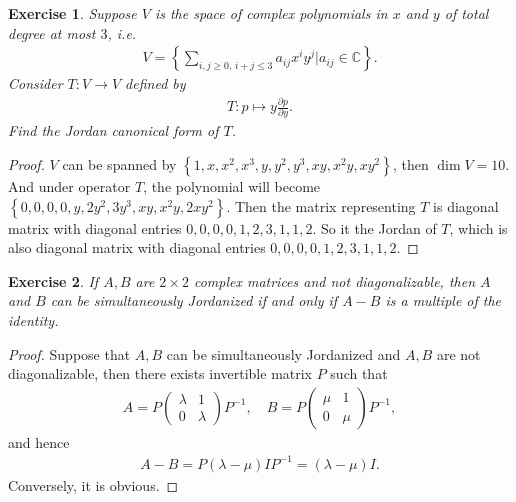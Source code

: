 \documentclass[11pt]{book}
\newtheorem{exercise}{Exercise}[section]
\theoremstyle{definition}
\numberwithin{equation}{chapter}
\begin{document}
\medskip

\begin{exercise}
Suppose $V$ is the space of complex polynomials in $x$ and $y$ of total degree at most $3$, i.e.
\begin{align*}
    V = \left\{\sum_{i,j \geq 0,\,i+j \leq 3} a_{ij} x^i y^j \Bigg| a_{ij} \in \mathbb{C} \right\}.
\end{align*}
Consider $T: V \to V$ defined by 
\begin{align*}
    T: p \mapsto y \frac{\partial p}{\partial y}.
\end{align*}
Find the Jordan canonical form of $T$.
\end{exercise}
\begin{proof}
$V$ can be spanned by $\left\{1, x, x^2, x^3, y, y^2, y^3, xy, x^2y, xy^2\right\}$, then $\dim  V = 10$. And under operator $T$, the polynomial will become $\left\{0, 0, 0, 0, y, 2y^2, 3y^3, xy, x^2y, 2xy^2\right\}$. Then the matrix representing $T$ is diagonal matrix with diagonal entries $0,0,0,0,1,2,3,1,1,2$. So it the Jordan of $T$, which is also diagonal matrix with diagonal entries $0,0,0,0,1,2,3,1,1,2$.
\end{proof}

\medskip

\begin{exercise}
If $A, B$ are $2 \times 2$ complex matrices and not diagonalizable, then $A$ and $B$ can be simultaneously Jordanized if and only if $A - B$ is a multiple of the identity.
\end{exercise}
\begin{proof}
Suppose that $A, B$ can be simultaneously Jordanized and $A, B$ are not diagonalizable, then there exists invertible matrix $P$ such that 
\begin{align*}
    A = P \begin{pmatrix}
        \lambda & 1 \\
        0 & \lambda
    \end{pmatrix} P^{-1}, \quad B = P \begin{pmatrix}
        \mu & 1 \\
        0 & \mu
    \end{pmatrix} P^{-1},
\end{align*}
and hence 
\begin{align*}
    A - B = P (\lambda - \mu) I P^{-1} = (\lambda - \mu) I.
\end{align*}
Conversely, it is obvious.
\end{proof}
\end{document}
